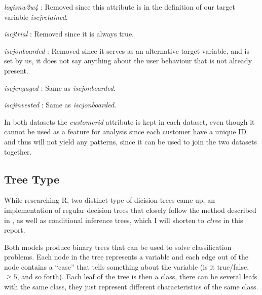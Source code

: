 \begin{itemize*}

	\item \textit{logisnw2w4} : Removed since this attribute is in the definition
	      of our target variable \textit{iscjretained}.

	\item \textit{iscjtrial} : Removed since it is always true.

	\item \textit{iscjonboarded} : Removed since it serves as an alternative
	      target variable, and is set by us, it does not say anything about the
	      user behaviour that is not already present.

	\item \textit{iscjengaged} : Same as \textit{iscjonboarded}.

	\item \textit{iscjinvested} : Same as \textit{iscjonboarded}.
\end{itemize*}

In both datasets the \textit{customerid} attribute is kept in each dataset, even
though it cannot be used as a feature for analysis since each customer have a
unique ID and thus will not yield any patterns, since it can be used to join the
two datasets together.


\subsection{Tree Type}

While researching R, two distinct type of dicision trees came up, an
implementation of regular decision trees that closely follow the method
described in \cite{breiman1}, as well as conditional inference
trees\cite{hothorn2006unbiased}, which I will shorten to \textit{ctree} in this
report.

Both models produce binary trees that can be used to solve classification
problems. Each node in the tree represents a variable and each edge out of the
node contains a ``case'' that tells something about the variable (is it
true/false, $\geq 5$, and so forth). Each leaf of the tree is then a class,
there can be several leafs with the same class, they just represent different
characteristics of the same class.

